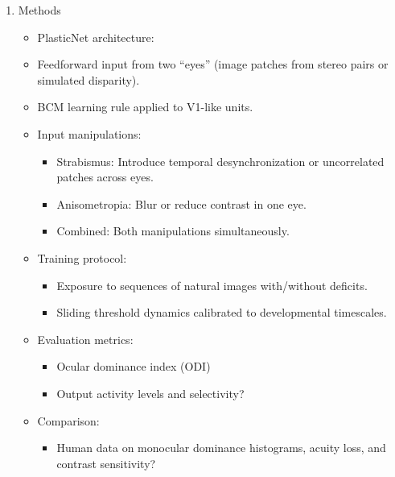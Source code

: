 \documentclass[
]{article}
\providecommand{\tightlist}{%
  \setlength{\itemsep}{0pt}\setlength{\parskip}{0pt}}
\begin{document}
\begin{enumerate}
\def\labelenumi{\arabic{enumi}.}
\setcounter{enumi}{3}
\tightlist
\item
  Methods

  \begin{itemize}
  \tightlist
  \item[$\boxtimes$]
    PlasticNet architecture:
  \item[$\boxtimes$]
    Feedforward input from two ``eyes'' (image patches from stereo pairs
    or simulated disparity).
  \item[$\boxtimes$]
    BCM learning rule applied to V1-like units.
  \item[$\boxtimes$]
    Input manipulations:

    \begin{itemize}
    \tightlist
    \item[$\boxtimes$]
      Strabismus: Introduce temporal desynchronization or uncorrelated
      patches across eyes.
    \item[$\boxtimes$]
      Anisometropia: Blur or reduce contrast in one eye.
    \item[$\boxtimes$]
      Combined: Both manipulations simultaneously.
    \end{itemize}
  \item[$\boxtimes$]
    Training protocol:

    \begin{itemize}
    \tightlist
    \item[$\boxtimes$]
      Exposure to sequences of natural images with/without deficits.
    \item[$\boxtimes$]
      Sliding threshold dynamics calibrated to developmental timescales.
    \end{itemize}
  \item[$\boxtimes$]
    Evaluation metrics:

    \begin{itemize}
    \tightlist
    \item[$\boxtimes$]
      Ocular dominance index (ODI)
    \item[$\square$]
      Output activity levels and selectivity?
    \end{itemize}
  \item[$\square$]
    Comparison:

    \begin{itemize}
    \tightlist
    \item[$\square$]
      Human data on monocular dominance histograms, acuity loss, and
      contrast sensitivity?
    \end{itemize}
  \end{itemize}
\end{enumerate}
\end{document}
